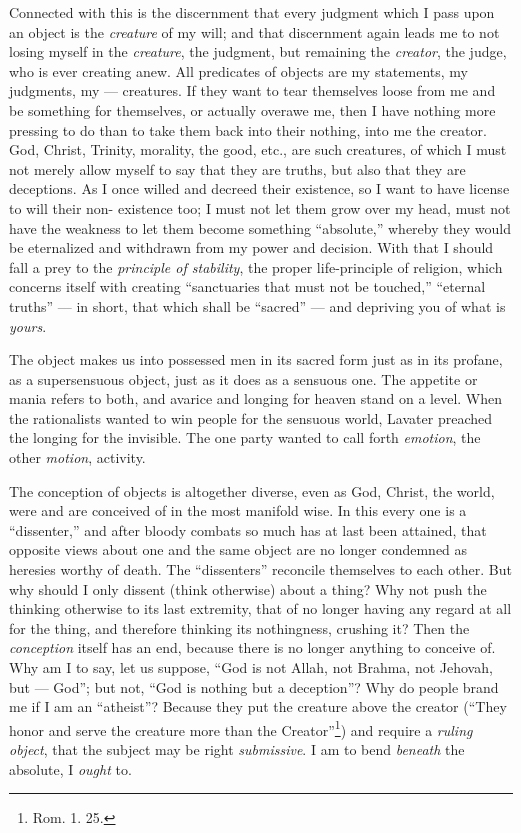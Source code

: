 Connected with this is the discernment that every judgment which I pass upon 
an object is the \textit{creature} of my will; and that discernment again 
leads me to not losing myself in the \textit{creature}, the judgment, but 
remaining the \textit{creator}, the judge, who is ever creating anew. All 
predicates of objects are my statements, my judgments, my --- creatures. If 
they want to tear themselves loose from me and be something for themselves, or 
actually overawe me, then I have nothing more pressing to do than to take them 
back into their nothing, into me the creator. God, Christ, Trinity, morality, 
the good, etc., are such creatures, of which I must not merely allow myself to 
say that they are truths, but also that they are deceptions. As I once willed 
and decreed their existence, so I want to have license to will their non- 
existence too; I must not let them grow over my head, must not have the 
weakness to let them become something ``absolute,'' whereby they would be 
eternalized and withdrawn from my power and decision. With that I should fall 
a prey to the \textit{principle of stability}, the proper life-principle of 
religion, which concerns itself with creating ``sanctuaries that must not be 
touched,'' ``eternal truths'' --- in short, that which shall be ``sacred'' --- and depriving you of what is \textit{yours}.

The object makes us into possessed men in its sacred form just as in its 
profane, as a supersensuous object, just as it does as a sensuous one. The 
appetite or mania refers to both, and avarice and longing for heaven stand on 
a level. When the rationalists wanted to win people for the sensuous world, 
Lavater preached the longing for the invisible. The one party wanted to call 
forth \textit{emotion}, the other \textit{motion}, activity.

 The conception of objects is altogether diverse, even as God, Christ, the 
world, were and are conceived of in the most manifold wise. In this every one 
is a ``dissenter,'' and after bloody combats so much has at last been 
attained, that opposite views about one and the same object are no longer 
condemned as heresies worthy of death. The ``dissenters'' reconcile 
themselves to each other. But why should I only dissent (think otherwise) 
about a thing? Why not push the thinking otherwise to its last extremity, that 
of no longer having any regard at all for the thing, and therefore thinking 
its nothingness, crushing it? Then the \textit{conception} itself has an end, 
because there is no longer anything to conceive of. Why am I to say, let us 
suppose, ``God is not Allah, not Brahma, not Jehovah, but --- God''; but not, 
``God is nothing but a deception''? Why do people brand me if I am an 
``atheist''? Because they put the creature above the creator (``They honor 
and serve the creature more than the Creator''\footnote{Rom. 1. 25.}) and 
require a \textit{ruling object}, that the subject may be right 
\textit{submissive}. I am to bend \textit{beneath} the absolute, I 
\textit{ought} to.

